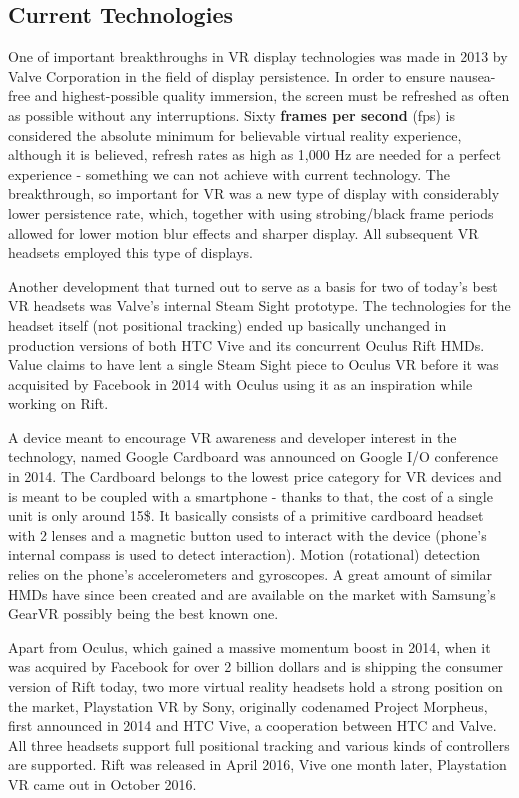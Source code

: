 \documentclass[12pt, a4paper]{article}
\begin{document}
\subsection{Current Technologies}
One of important breakthroughs in VR display technologies was made in 2013 by Valve Corporation in the field of display persistence. In order to ensure nausea-free and highest-possible quality immersion, the screen must be refreshed as often as possible without any interruptions. Sixty \textbf{frames per second} (fps) is considered the absolute minimum for believable virtual reality experience, although it is believed, refresh rates as high as 1,000 Hz are needed for a perfect experience - something we can not achieve with current technology. The breakthrough, so important for VR was a new type of display with considerably lower persistence rate, which, together with using strobing/black frame periods allowed for lower motion blur effects and sharper display. All subsequent VR headsets employed this type of displays.

Another development that turned out to serve as a basis for two of today’s best VR headsets was Valve’s internal Steam Sight prototype. The technologies for the headset itself (not positional tracking) ended up basically unchanged in production versions of both HTC Vive and its concurrent Oculus Rift HMDs. Value claims to have lent a single Steam Sight piece to Oculus VR before it was acquisited by Facebook in 2014 with Oculus using it as an inspiration while working on Rift.

A device meant to encourage VR awareness and developer interest in the technology, named Google Cardboard was announced on Google I/O conference in 2014. The Cardboard belongs to the lowest price category for VR devices and is meant to be coupled with a smartphone - thanks to that, the cost of a single unit is only around 15\$. It basically consists of a primitive cardboard headset with 2 lenses and a magnetic button used to interact with the device (phone’s internal compass is used to detect interaction). Motion (rotational) detection relies on the phone’s accelerometers and gyroscopes. A great amount of similar HMDs have since been created and are available on the market with Samsung’s GearVR possibly being the best known one.

Apart from Oculus, which gained a massive momentum boost in 2014, when it was acquired by Facebook for over 2 billion dollars and is shipping the consumer version of Rift today, two more virtual reality headsets hold a strong position on the market, Playstation VR by Sony, originally codenamed Project Morpheus, first announced in 2014 and HTC Vive, a cooperation between HTC and Valve. All three headsets support full positional tracking and various kinds of controllers are supported. Rift was released in April 2016, Vive one month later, Playstation VR came out in October 2016.
\end{document}
